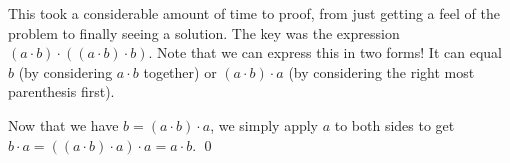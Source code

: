 \begin{Exercise}
	This took a considerable amount of time to proof, from just getting a feel of the problem to finally seeing a solution.
	The key was the expression $(a\cdot b) \cdot ((a\cdot b) \cdot b)$. Note that we can express this in two forms! 
	It can equal $b$ (by considering $a\cdot b$ together) or $(a\cdot b) \cdot a$ (by considering the right most parenthesis first).

	Now that we have $b = (a\cdot b) \cdot a$, we simply apply $a$ to both sides to get $b \cdot a = ((a\cdot b) \cdot a) \cdot a = a \cdot b$. \qed
\end{Exercise}
